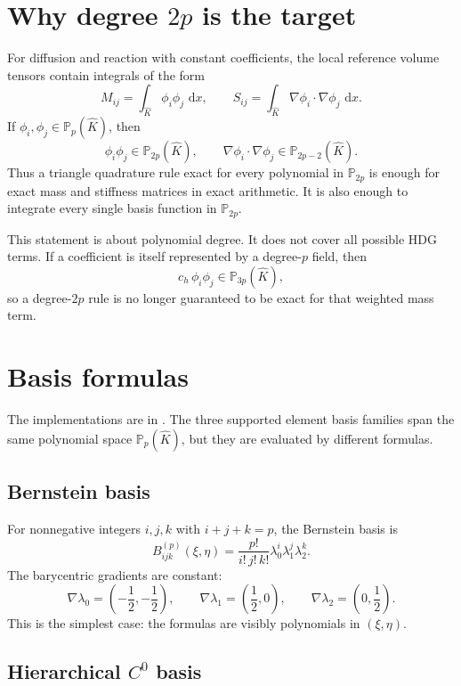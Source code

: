 \documentclass[11pt]{article}
\newcommand{\code}[1]{\texttt{\detokenize{#1}}}
\newcommand{\Phat}{\mathbb P}
\newcommand{\Khat}{\widehat K}
\newcommand{\dd}{\,\mathrm d}
\newcommand{\grad}{\nabla}
\newcommand{\lam}{\lambda}
\begin{document}
\section{\texorpdfstring{Why degree \(2p\) is the target}{Why degree 2p is the target}}

For diffusion and reaction with constant coefficients, the local reference
volume tensors contain integrals of the form
\[
  M_{ij} = \int_{\Khat} \phi_i\phi_j\,\dd x,
  \qquad
  S_{ij} = \int_{\Khat} \grad\phi_i\cdot\grad\phi_j\,\dd x.
\]
If \(\phi_i,\phi_j\in\Phat_p(\Khat)\), then
\[
  \phi_i\phi_j\in\Phat_{2p}(\Khat),
  \qquad
  \grad\phi_i\cdot\grad\phi_j\in\Phat_{2p-2}(\Khat).
\]
Thus a triangle quadrature rule exact for every polynomial in
\(\Phat_{2p}\) is enough for exact mass and stiffness matrices in exact
arithmetic.  It is also enough to integrate every single basis function in
\(\Phat_{2p}\).

This statement is about polynomial degree.  It does not cover all possible HDG
terms.  If a coefficient is itself represented by a degree-\(p\) field, then
\[
  c_h\,\phi_i\phi_j \in \Phat_{3p}(\Khat),
\]
so a degree-\(2p\) rule is no longer guaranteed to be exact for that weighted
mass term.

\section{Basis formulas}

The implementations are in \code{hdgfem/core/basis.py}.  The three supported
element basis families span the same polynomial space \(\Phat_p(\Khat)\), but
they are evaluated by different formulas.

\subsection{Bernstein basis}

For nonnegative integers \(i,j,k\) with \(i+j+k=p\), the Bernstein basis is
\[
  B_{ijk}^{(p)}(\xi,\eta)
  =
  \frac{p!}{i!\,j!\,k!}
  \lam_0^i\lam_1^j\lam_2^k.
\]
The barycentric gradients are constant:
\[
  \grad\lam_0=\left(-\frac12,-\frac12\right),\qquad
  \grad\lam_1=\left(\frac12,0\right),\qquad
  \grad\lam_2=\left(0,\frac12\right).
\]
This is the simplest case: the formulas are visibly polynomials in
\((\xi,\eta)\).

\subsection{\texorpdfstring{Hierarchical \(C^0\) basis}{Hierarchical C0 basis}}
\end{document}
